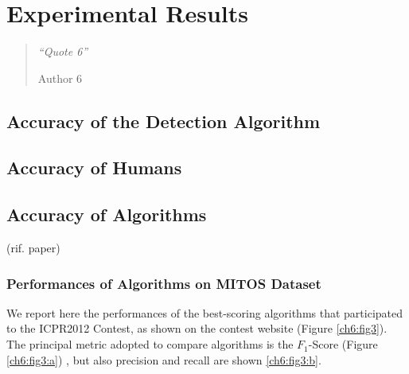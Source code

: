 \chapter{Experimental Results}
\label{chapter6}
\thispagestyle{empty}

\begin{quotation}
{\footnotesize
\noindent\emph{``Quote 6''}
\begin{flushright}
Author 6
\end{flushright}
}
\end{quotation}

\vspace{0.5cm}


\section{Accuracy of the Detection Algorithm}

\vspace{0.5cm}

\section{Accuracy of Humans}

\vspace{0.5cm}

\section{Accuracy of Algorithms}

(rif. paper)

\subsection{Performances of Algorithms on MITOS Dataset}
\label{ch6:icpr_perf}

We report here the performances of the best-scoring algorithms that participated to the ICPR2012 Contest, as shown on the contest website (Figure \ref{ch6:fig3}).
The principal metric adopted to compare algorithms is the $F_1$-Score (Figure \ref{ch6:fig3:a}) , but also precision and recall are shown \ref{ch6:fig3:b}. 

